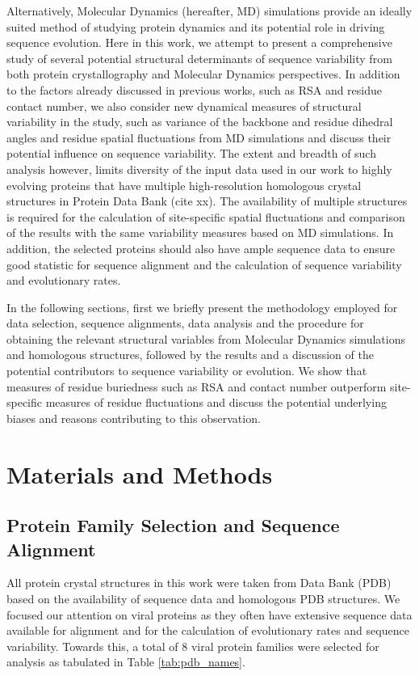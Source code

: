 \documentclass[12pt]{article}
\begin{document}
Alternatively, Molecular Dynamics (hereafter, MD) simulations provide an ideally suited method of studying protein dynamics and its potential role in driving sequence evolution.  Here in this work, we attempt to present a comprehensive study of several potential structural determinants of sequence variability from both protein crystallography and Molecular Dynamics perspectives. In addition to the factors already discussed in previous works, such as RSA and residue contact number, we also consider new dynamical measures of structural variability in the study, such as variance of the backbone and residue dihedral angles and residue spatial fluctuations from MD simulations and discuss their potential influence on sequence variability. The extent and breadth of such analysis however, limits diversity of the input data used in our work to highly evolving proteins that have multiple high-resolution homologous crystal structures in Protein Data Bank (cite xx). The availability of multiple structures is required for the calculation of site-specific spatial fluctuations and comparison of the results with the same variability measures based on MD simulations. In addition, the selected proteins should also have ample sequence data to ensure good statistic for sequence alignment and the calculation of sequence variability and evolutionary rates.
	
In the following sections, first we briefly present the methodology employed for data selection, sequence alignments, data analysis and the procedure for obtaining the relevant structural variables from Molecular Dynamics simulations and homologous structures, followed by the results and a discussion of the potential contributors to sequence variability or evolution. We show that measures of residue buriedness such as RSA and contact number outperform site-specific measures of residue fluctuations and discuss the potential underlying biases and reasons contributing to this observation.

\section*{Materials and Methods}

\subsection*{Protein Family Selection and Sequence Alignment}
	
All protein crystal structures in this work were taken from Data Bank (PDB) based on the availability of sequence data and homologous PDB structures. We focused our attention on viral proteins as they often have extensive sequence data available for alignment and for the calculation of evolutionary rates and sequence variability. Towards this, a total of $8$ viral protein families were selected for analysis as tabulated in Table \ref{tab:pdb_names}.
\end{document}
